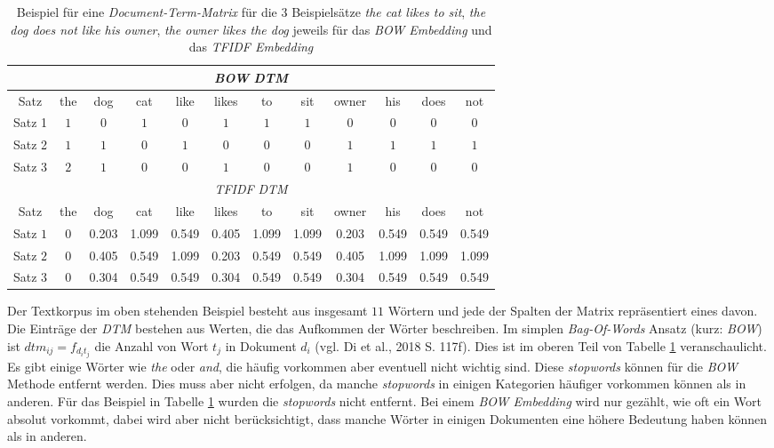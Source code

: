 \documentclass[a4paper,11pt]{article}
\begin{document}
\begin{table}[ht]
\begin{center}
    

\begin{tabular}{|c||ccccccccccc|}
\hline
\multicolumn{12}{|c|}{\textit{BOW} \textit{DTM}} \\
\hline 
   Satz   & the & dog & cat & like & likes &  to & sit  & owner & his &  does & not \\
      \hline
Satz 1 & $1$ & $0$ & $1$ & $0$ & $1$ & $1$ & $1$ & $0$ & $0$ &  $0$ & $0$ \\
Satz 2 & $1$ & $1$ & $0$ & $1$ & $0$ & $0$ & $0$ & $1$ & $1$ &  $1$ & $1$ \\
Satz 3 & $2$ & $1$ & $0$ & $0$ & $1$ & $0$ & $0$ & $1$ & $0$ &  $0$ & $0$ \\

\hline

\multicolumn{12}{|c|}{\textit{TFIDF} \textit{DTM}} \\
\hline 
   Satz   & the & dog & cat & like & likes &  to & sit  & owner & his &  does & not \\
      \hline
Satz $1$ & 0 & 0.203 & 1.099 & 0.549 & 0.405 & 1.099 & 1.099 & 0.203 & 0.549 & 0.549 & 0.549 \\ 
Satz  $2$ & 0 & 0.405 & 0.549 & 1.099 & 0.203 & 0.549 & 0.549 & 0.405 & 1.099 & 1.099 & 1.099 \\ 
Satz $3$ & 0 & 0.304 & 0.549 & 0.549 & 0.304 & 0.549 & 0.549 & 0.304 & 0.549 & 0.549 & 0.549 \\  
\hline
\end{tabular}
\end{center}{}
\caption{Beispiel für eine \textit{Document-Term-Matrix} für die $3$ Beispielsätze \textit{the cat likes to sit}, \textit{the dog does not like his owner}, \textit{the owner likes the dog} jeweils für das \textit{BOW Embedding} und das \textit{TFIDF Embedding} }  
\label{tab:BOWExample}

\end{table}

Der Textkorpus im oben stehenden Beispiel besteht aus insgesamt $11$ Wörtern und jede der Spalten der Matrix repräsentiert eines davon.
Die Einträge der \textit{DTM} bestehen aus Werten, die das Aufkommen der Wörter beschreiben. Im simplen \textit{Bag-Of-Words} Ansatz (kurz: \textit{BOW}) ist $dtm_{ij} = f_{d_i t_j}$ die Anzahl von Wort $t_j$ in Dokument $d_i$ (vgl. Di et al., 2018 S. 117f). Dies ist im oberen Teil von Tabelle \ref{tab:BOWExample} veranschaulicht. Es gibt einige Wörter wie \textit{the} oder \textit{and}, die häufig vorkommen aber eventuell nicht wichtig sind. Diese \textit{stopwords} können für die \textit{BOW} Methode entfernt werden. Dies muss aber nicht erfolgen, da manche \textit{stopwords} in einigen Kategorien häufiger vorkommen können als in anderen. Für das Beispiel in Tabelle \ref{tab:BOWExample} wurden die \textit{stopwords} nicht entfernt.
Bei einem \textit{BOW Embedding} wird nur gezählt, wie oft ein Wort absolut vorkommt, dabei wird aber nicht berücksichtigt, dass manche Wörter in einigen Dokumenten eine höhere Bedeutung haben können als in anderen. \\
\end{document}
